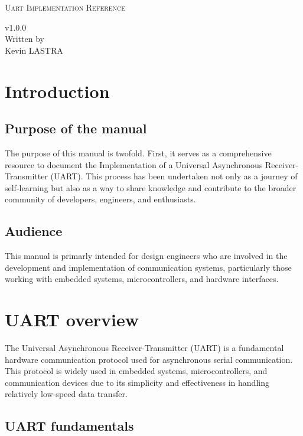 \documentclass[12pt]{article}
\def\UART_VERSION{v1.0.0}
\begin{document}
\begin{titlepage}
  \centering
  {\LARGE \textsc{Uart Implementation Reference}\par}
  {\vspace{1cm}}
  \UART_VERSION \\
  {\vspace{16cm}}
  Written by \\
  Kevin LASTRA
\end{titlepage}
\tableofcontents
\newpage

\section{Introduction}

\subsection{Purpose of the manual}
The purpose of this manual is twofold. First, it serves as a 
comprehensive resource to document the Implementation of a 
Universal Asynchronous Receiver-Transmitter (UART). This process 
has been undertaken not only as a journey of self-learning but also 
as a way to share knowledge and contribute to the broader community
of developers, engineers, and enthusiasts.

\subsection{Audience}
This manual is primarly intended for design engineers who are 
involved in the development and implementation of communication
systems, particularly those working with embedded systems, 
microcontrollers, and hardware interfaces.

\newpage
\section{UART overview}
The Universal Asynchronous Receiver-Transmitter (UART) is a 
fundamental hardware communication protocol used for asynchronous
serial communication. \\
This protocol is widely used in embedded systems, 
microcontrollers, and communication devices due to its simplicity and effectiveness
in handling relatively low-speed data transfer.
\subsection{UART fundamentals}
\end{document}
